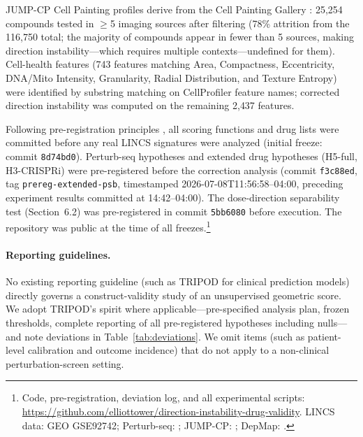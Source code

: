 \documentclass[11pt]{article}
\begin{document}
JUMP-CP Cell Painting profiles derive from the Cell Painting Gallery
\citep{chandrasekaran2023jump}: 25{,}254 compounds tested in $\geq$5
imaging sources after filtering (78\% attrition from the 116{,}750
total; the majority of compounds appear in fewer than 5 sources,
making direction instability---which requires multiple
contexts---undefined for them). Cell-health features (743 features matching Area,
Compactness, Eccentricity, DNA/Mito Intensity, Granularity, Radial
Distribution, and Texture Entropy) were identified by substring matching
on CellProfiler feature names; corrected direction instability was computed
on the remaining 2{,}437 features.

Following pre-registration principles \citep{nosek2018preregistration},
all scoring functions and drug lists were committed before any real LINCS
signatures were analyzed (initial freeze: commit \texttt{8d74bd0}).
Perturb-seq hypotheses and extended drug hypotheses (H5-full,
H3-CRISPRi) were pre-registered before the correction analysis
(commit \texttt{f3c88ed}, tag \texttt{prereg-extended-psb}, timestamped
2026-07-08T11:56:58--04:00, preceding experiment results committed at
14:42--04:00). The dose-direction separability test
(Section~6.2) was pre-registered in commit \texttt{5bb6080} before
execution. The repository was public at the time of all freezes.\footnote{Code, pre-registration, deviation log, and all
experimental scripts:
\url{https://github.com/elliottower/direction-instability-drug-validity}.
LINCS data: GEO GSE92742; Perturb-seq: \citet{replogle2022mapping};
JUMP-CP: \citet{chandrasekaran2023jump}; DepMap: \citet{dempster2021chronos}.}

\paragraph{Reporting guidelines.}
No existing reporting guideline (such as TRIPOD for clinical prediction models)
directly governs a construct-validity study of an unsupervised geometric score.
We adopt TRIPOD's spirit where applicable---pre-specified analysis plan,
frozen thresholds, complete reporting of all pre-registered hypotheses
including nulls---and note deviations in Table~\ref{tab:deviations}.
We omit items (such as patient-level calibration and outcome incidence) that
do not apply to a non-clinical perturbation-screen setting.
\end{document}
